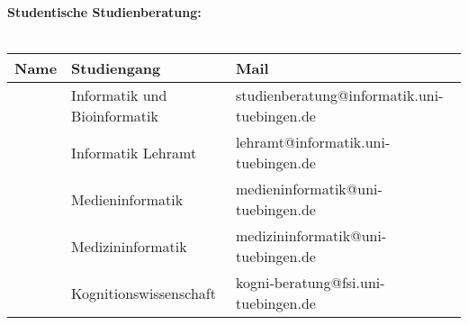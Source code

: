 \textbf{Studentische Studienberatung:}\\\\
\begin{tabular}{|lll|}
	\hline
	Name                 & Studiengang                  & Mail                                                                       \\
	\hline
	\hline
	\studBeratungInfo    & Informatik und Bioinformatik & studienberatung@informatik.uni-tuebingen.de\footnotemark[\value{footnote}] \\
	\studBeratungLehramt & Informatik Lehramt           & lehramt@informatik.uni-tuebingen.de\footnotemark[\value{footnote}]         \\
	\studBeratungMedien  & Medieninformatik             & medieninformatik@uni-tuebingen.de\footnotemark[\value{footnote}]           \\
	\studBeratungMedizin & Medizininformatik            & medizininformatik@uni-tuebingen.de\footnotemark[\value{footnote}]          \\
	\studBeratungKogni   & Kognitionswissenschaft       & kogni-beratung@fsi.uni-tuebingen.de\footnotemark[\value{footnote}]         \\
	\hline
\end{tabular}
\vfill
{}
\normalsize
